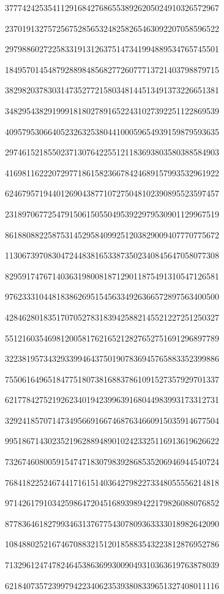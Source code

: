 \begin{center}
37774242535411291684276865538926205024910326572967

23701913275725675285653248258265463092207058596522

29798860272258331913126375147341994889534765745501

18495701454879288984856827726077713721403798879715

38298203783031473527721580348144513491373226651381

34829543829199918180278916522431027392251122869539

40957953066405232632538044100059654939159879593635

29746152185502371307642255121183693803580388584903

41698116222072977186158236678424689157993532961922

62467957194401269043877107275048102390895523597457

23189706772547915061505504953922979530901129967519

86188088225875314529584099251203829009407770775672

11306739708304724483816533873502340845647058077308

82959174767140363198008187129011875491310547126581

97623331044818386269515456334926366572897563400500

42846280183517070527831839425882145521227251250327

55121603546981200581762165212827652751691296897789

32238195734329339946437501907836945765883352399886

75506164965184775180738168837861091527357929701337

62177842752192623401942399639168044983993173312731

32924185707147349566916674687634660915035914677504

99518671430235219628894890102423325116913619626622

73267460800591547471830798392868535206946944540724

76841822524674417161514036427982273348055556214818

97142617910342598647204516893989422179826088076852

87783646182799346313767754307809363333018982642090

10848802521674670883215120185883543223812876952786

71329612474782464538636993009049310363619763878039

62184073572399794223406235393808339651327408011116


\end{center}
